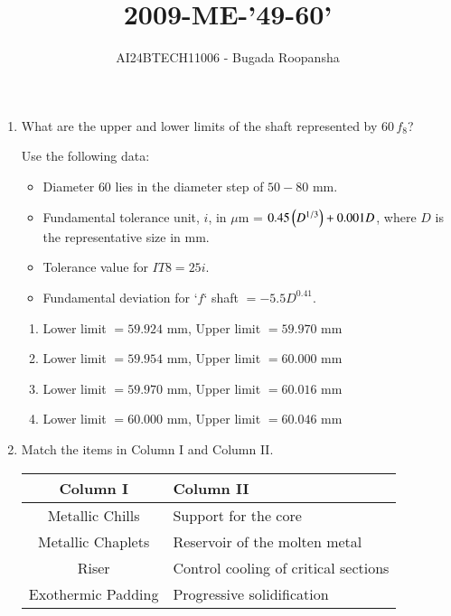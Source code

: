 \documentclass[journal,12pt,twocolumn]{IEEEtran}
\theoremstyle{remark}
\begin{document}
                        
                        \vspace{3cm}
                        \title{2009-ME-'49-60'}
                        \author{AI24BTECH11006 - Bugada Roopansha}
                        \maketitle
                        \begin{enumerate}[start=49]
 \item What are the upper and lower limits of the shaft represented by $60 \, f_8$?
    
    Use the following data:
    \begin{itemize}
        \item Diameter $60$ lies in the diameter step of $50 - 80$ mm.
        \item Fundamental tolerance unit, $i$, in $\mu$m = $0.45 \left(D^{1/3}\right) + 0.001 D$, where $D$ is the representative size in mm.
        \item Tolerance value for $IT8 = 25i$.
        \item Fundamental deviation for `$f$` shaft $= -5.5 D^{0.41}$.
    \end{itemize}
    
    \begin{enumerate}
        \item Lower limit $= 59.924$ mm, Upper limit $= 59.970$ mm
        \item Lower limit $= 59.954$ mm, Upper limit $= 60.000$ mm
        \item Lower limit $= 59.970$ mm, Upper limit $= 60.016$ mm
        \item Lower limit $= 60.000$ mm, Upper limit $= 60.046$ mm
    \end{enumerate}
    
    \item Match the items in Column I and Column II.
    
    \begin{table}[h!]
        \centering
        \begin{tabular}{|c|l|}
            \hline
            \textbf{Column I} & \textbf{Column II} \\
            \hline
            Metallic Chills & Support for the core \\
            \hline
            Metallic Chaplets & Reservoir of the molten metal \\
            \hline
            Riser & Control cooling of critical sections \\
            \hline
            Exothermic Padding & Progressive solidification \\
            \hline
        \end{tabular}
    \end{table}
    

\end{enumerate}
\end{document}
